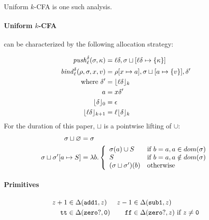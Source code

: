 \documentclass[preprint,onecolumn,9pt]{sigplanconf} %
\begin{document}
Uniform \(k\)-CFA is one such analysis.

\paragraph{Uniform \(k\)-CFA} can be characterized by the following allocation
strategy:

\begin{align*}
\mathit{push}_{\ell}^{\delta}(\sigma,\kappa) &=
  {\ell}{\delta},\sigma\sqcup[{\ell}{\delta}\mapsto\{\kappa\}] \\
\mathit{bind}^{\delta}_{\ell}(\rho,\sigma,x,v) &= \rho[x \mapsto a],
                                           \sigma\sqcup[a \mapsto
                                             \{ v\}],
                                           {\delta}' \\
\mbox{where } {\delta}' &= \lfloor{\ell}{\delta}\rfloor_k \\
              a &= x{\delta}' \\
              \lfloor {\delta} \rfloor_0 &= {\epsilon} \\
              \lfloor {\ell}{\delta} \rfloor_{k+1} &= {\ell}\lfloor {\delta}\rfloor_k
\end{align*}
For the duration of this paper, $\sqcup$ is a pointwise lifting of $\cup$:
\begin{align*}
\sigma\sqcup \varnothing &= \sigma \\
\sigma\sqcup \sigma'[a \mapsto S] &= \lambda b. \left\{ 
  \begin{array}{ll}
    \sigma(a)\cup S & \mbox{if } b = a, a\in dom(\sigma) \\
    S & \mbox{if } b = a, a\notin dom(\sigma) \\
    (\sigma\sqcup\sigma')(b) & \mbox{otherwise}
  \end{array}\right.
\end{align*}

\paragraph{Primitives}

\begin{align*}
z+1 &\in \Delta({\tt add1},z) &
z-1 &\in \Delta({\tt sub1},z)\\
{\tt tt} &\in \Delta({\tt zero?},{\tt 0}) &
{\tt ff} &\in \Delta({\tt zero?},z)\text{ if }z\neq {\tt 0}\\
\end{align*}
\end{document}
